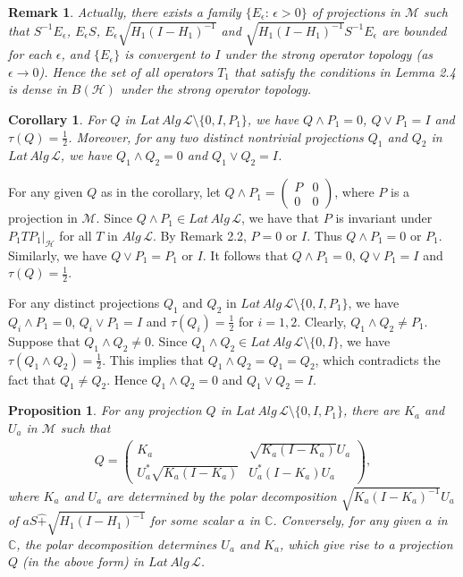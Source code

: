 \documentclass[12pt]{article}
\newtheorem{corollary}{Corollary}[section]
\newtheorem{prop}{Proposition}[section]
\newtheorem{remark}{Remark}[section]
\newcommand{\HHH}{\mathcal H} %
\newcommand{\LLL}{\mathcal L} %
\newcommand{\MMM}{\mathcal M}
\newcommand{\C}{\mathbb C} %
\def\L{{\mathcal{L}}}
\begin{document}
{\begin{remark}
Actually, there exists a family $\{E_{\epsilon}:\,\epsilon>0\}$ of
projections in $\MMM$ such that $S^{-1}E_{\epsilon}$,
$E_{\epsilon}S$, $E_{\epsilon}\sqrt{H_{1}(I-H_{1})^{-1}}$ and
$\sqrt{H_{1}(I-H_{1})^{-1}}S^{-1}E_{\epsilon}$ are bounded for each
$\epsilon$, and $\{E_{\epsilon}\}$ is convergent to $I$ under the
strong operator topology (as $\epsilon\rightarrow 0$). Hence the set
of all operators $T_1$ that satisfy the conditions in Lemma 2.4 is
dense in $B(\HHH)$ under the strong operator topology.
\end{remark}

\begin{corollary} For $Q$ in $Lat\,Alg\,\L \setminus \{0,I, P_1\}$,
 we have $Q\wedge P_1=0$, $Q\vee P_1=I$ and $\tau(Q)=\frac12$.
Moreover, for any two distinct nontrivial projections $Q_1$ and
$Q_2$ in $Lat\,Alg\,\L$,
 we have $Q_1\wedge Q_2=0$ and $Q_1\vee Q_2=I$.
\end{corollary}


 \quad For any given $Q$ as in the corollary, let $Q\wedge P_1=\left(\begin{array}{cc} P & 0 \\ 0 &
0\end{array}\right)$, where $P$ is a projection in $\MMM$. Since
$Q\wedge P_1 \in Lat\,Alg\,\L$, we have that $P$ is invariant under
$P_1TP_1|_{\HHH}$ for all $T$ in $Alg\,\L$. By Remark 2.2, $P=0$ or
$I$. Thus $Q\wedge P_1=0$ or $P_1$. Similarly, we have $Q\vee
P_1=P_1$ or $I$. It follows that $Q\wedge P_1=0$, $Q\vee P_1=I$ and
$\tau(Q)=\frac12$.

For any distinct projections $Q_1$ and $Q_2$ in $Lat\,Alg\,\L
\setminus \{0, I, P_1 \}$, we have $Q_i\wedge P_1=0$, $Q_i\vee
P_1=I$ and $\tau(Q_i)=\frac12$ for $i=1,2$. Clearly, $Q_1\wedge
Q_2\neq P_1$. Suppose that $Q_1\wedge Q_2\neq 0$. Since $Q_1\wedge
Q_2 \in Lat\,Alg\,\L \setminus \{0,I\}$, we have $\tau(Q_1\wedge
Q_2)=\frac12$. This implies that $Q_1\wedge Q_2=Q_1=Q_2$, which
contradicts  the fact that $Q_1 \neq Q_2$. Hence $Q_1\wedge Q_2=0$
and $Q_1\vee Q_2=I$. \vspace{2mm}



\begin{prop}
For any projection $Q$ in $Lat\,Alg\,\LLL \setminus \{0, I,
P_{1}\}$, there are $K_a$ and $U_a$ in $\MMM$ such that
\begin{align*}
Q = \left(\begin{array}{cc}K_{a} & \sqrt{K_{a}(I-K_{a})}U_{a} \\U_{a}^{*}\sqrt{K_{a}(I-K_{a})} &
U_{a}^{*}(I-K_{a})U_{a} \end{array}\right),
\end{align*}
where $K_{a}$ and $U_{a}$ are determined by the polar decomposition
$\sqrt{K_{a}(I-K_{a})^{-1}} U_{a}$ of $aS \widehat{+}
\sqrt{H_{1}(I-H_{1})^{-1}}$ for some scalar $a$ in $\C$. Conversely,
for any given $a$ in $\C$, the polar decomposition determines
$U_{a}$ and $K_{a}$, which give rise to a projection $Q$ (in the
above form) in $Lat\,Alg\,\LLL$.
\end{prop}


}
\end{document}
